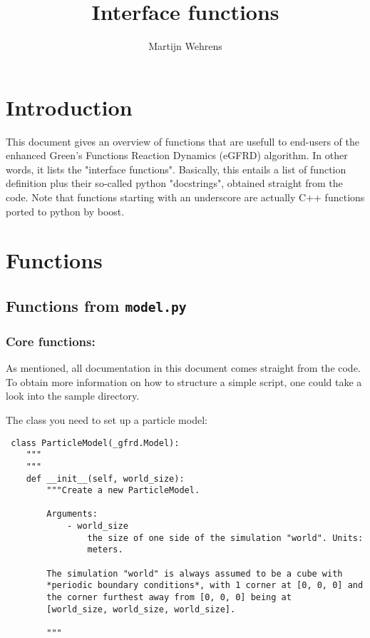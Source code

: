 \documentclass[a4paper,10pt]{article}
\title{Interface functions}
\author{Martijn Wehrens}
\begin{document}
\maketitle

\tableofcontents

\section{Introduction}
This document gives an overview of functions that are usefull to end-users of the enhanced Green's Functions Reaction Dynamics (eGFRD) algorithm. In other words, it lists the "interface functions".
Basically, this entails a list of function definition plus their so-called python "docstrings", obtained straight from the code.
Note that functions starting with an underscore are actually C++ functions ported to python by boost. 

\section{Functions}

\subsection{Functions from \texttt{model.py}}

\subsubsection{Core functions:}
As mentioned, all documentation in this document comes straight from the code. To obtain more information on how to structure a simple script, one could take a look into the sample directory.


The class you need to set up a particle model:
\begin{verbatim}
 class ParticleModel(_gfrd.Model):
    """
    """
    def __init__(self, world_size):
        """Create a new ParticleModel.

        Arguments:
            - world_size
                the size of one side of the simulation "world". Units: 
                meters.

        The simulation "world" is always assumed to be a cube with 
        *periodic boundary conditions*, with 1 corner at [0, 0, 0] and 
        the corner furthest away from [0, 0, 0] being at
        [world_size, world_size, world_size].

        """
\end{verbatim}
\end{document}
